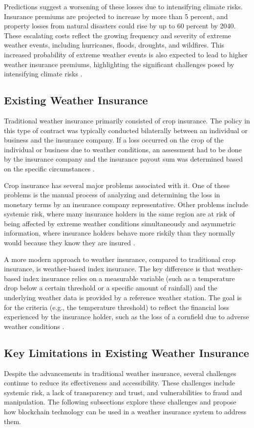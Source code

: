 Predictions suggest a worsening of these losses due to intensifying climate risks. Insurance premiums are projected to increase by more than 5 percent, and property losses from natural disasters could rise by up to 60 percent by 2040. These escalating costs reflect the growing frequency and severity of extreme weather events, including hurricanes, floods, droughts, and wildfires. This increased probability of extreme weather events is also expected to lead to higher weather insurance premiums, highlighting the significant challenges posed by intensifying climate risks \autocites{cho2022climate}{tucker1997climate}.

\subsection{Existing Weather Insurance}
Traditional weather insurance primarily consisted of crop insurance. The policy in this type of contract was typically conducted bilaterally between an individual or business and the insurance company. If a loss occurred on the crop of the individual or business due to weather conditions, an assessment had to be done by the insurance company and the insurance payout sum was determined based on the specific circumstances \autocite{michler2022risk}.

Crop insurance has several major problems associated with it. One of these problems is the manual process of analyzing and determining the loss in monetary terms by an insurance company representative. Other problems include systemic risk, where many insurance holders in the same region are at risk of being affected by extreme weather conditions simultaneously and asymmetric information, where insurance holders behave more riskily than they normally would because they know they are insured \autocite{makki2002crop}.

\sloppy A more modern approach to weather insurance, compared to traditional crop insurance, is weather-based index insurance. The key difference is that weather-based index insurance relies on a measurable variable (such as a temperature drop below a certain threshold or a specific amount of rainfall) and the underlying weather data is provided by a reference weather station. The goal is for the criteria (e.g., the temperature threshold) to reflect the financial loss experienced by the insurance holder, such as the loss of a cornfield due to adverse weather conditions \autocite{kajwang2022weather}.


\subsection{Key Limitations in Existing Weather Insurance}\label{section:key_limitations_existing_insurance}
Despite the advancements in traditional weather insurance, several challenges continue to reduce its effectiveness and accessibility. These challenges include systemic risk, a lack of transparency and trust, and vulnerabilities to fraud and manipulation. The following subsections explore these challenges and propose how blockchain technology can be used in a weather insurance system to address them.

